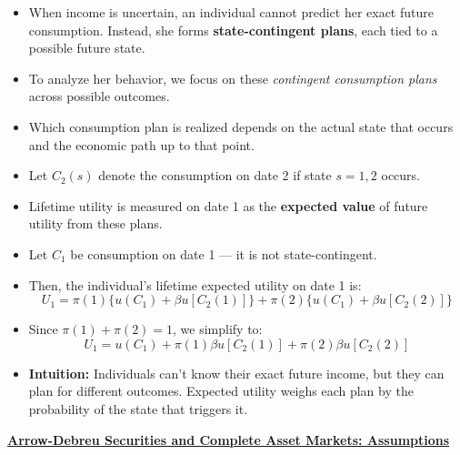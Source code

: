 \documentclass[12pt]{article}
\begin{document}
\begin{itemize}
\item When income is uncertain, an individual cannot predict her exact future consumption. Instead, she forms \textbf{state-contingent plans}, each tied to a possible future state.

\item To analyze her behavior, we focus on these \textit{contingent consumption plans} across possible outcomes.

\item Which consumption plan is realized depends on the actual state that occurs and the economic path up to that point.

\item Let $C_2(s)$ denote the consumption on date 2 if state $s = 1, 2$ occurs.

\item Lifetime utility is measured on date 1 as the \textbf{expected value} of future utility from these plans.

\item Let $C_1$ be consumption on date 1 — it is not state-contingent.

\item Then, the individual’s lifetime expected utility on date 1 is:
\[
U_1 = \pi(1)\{u(C_1) + \beta u[C_2(1)]\} + \pi(2)\{u(C_1) + \beta u[C_2(2)]\}
\]
\item Since $\pi(1) + \pi(2) = 1$, we simplify to:
\[
U_1 = u(C_1) + \pi(1)\beta u[C_2(1)] + \pi(2)\beta u[C_2(2)] \tag{1}
\]

\item \textbf{Intuition:} Individuals can’t know their exact future income, but they can plan for different outcomes. Expected utility weighs each plan by the probability of the state that triggers it.
\end{itemize}

\vspace{0.5cm}

\underline{\textbf{Arrow-Debreu Securities and Complete Asset Markets: Assumptions}}
\end{document}
